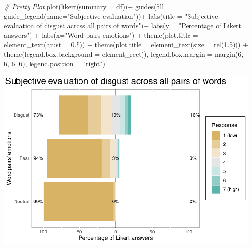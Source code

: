 \documentclass[
]{article}
\newenvironment{Shaded}{\begin{snugshade}}{\end{snugshade}}
\newcommand{\AttributeTok}[1]{\textcolor[rgb]{0.77,0.63,0.00}{#1}}
\newcommand{\CommentTok}[1]{\textcolor[rgb]{0.56,0.35,0.01}{\textit{#1}}}
\newcommand{\DecValTok}[1]{\textcolor[rgb]{0.00,0.00,0.81}{#1}}
\newcommand{\FloatTok}[1]{\textcolor[rgb]{0.00,0.00,0.81}{#1}}
\newcommand{\FunctionTok}[1]{\textcolor[rgb]{0.00,0.00,0.00}{#1}}
\newcommand{\NormalTok}[1]{#1}
\newcommand{\SpecialCharTok}[1]{\textcolor[rgb]{0.00,0.00,0.00}{#1}}
\newcommand{\StringTok}[1]{\textcolor[rgb]{0.31,0.60,0.02}{#1}}
\begin{document}
\begin{Shaded}
\begin{Highlighting}[]
\CommentTok{\# Pretty Plot}
\FunctionTok{plot}\NormalTok{(}\FunctionTok{likert}\NormalTok{(}\AttributeTok{summary =}\NormalTok{ df))}\SpecialCharTok{+} 
  \FunctionTok{guides}\NormalTok{(}\AttributeTok{fill =} \FunctionTok{guide\_legend}\NormalTok{(}\AttributeTok{name=}\StringTok{"Subjective evaluation"}\NormalTok{))}\SpecialCharTok{+} 
  \FunctionTok{labs}\NormalTok{(}\AttributeTok{title =} \StringTok{"Subjective evaluation of disgust across all pairs of words"}\NormalTok{)}\SpecialCharTok{+}
  \FunctionTok{labs}\NormalTok{(}\AttributeTok{y =} \StringTok{"Percentage of Likert answers"}\NormalTok{) }\SpecialCharTok{+}
  \FunctionTok{labs}\NormalTok{(}\AttributeTok{x=}\StringTok{"Word pairs\textquotesingle{} emotions"}\NormalTok{) }\SpecialCharTok{+}
  \FunctionTok{theme}\NormalTok{(}\AttributeTok{plot.title =} \FunctionTok{element\_text}\NormalTok{(}\AttributeTok{hjust =} \FloatTok{0.5}\NormalTok{)) }\SpecialCharTok{+}
  \FunctionTok{theme}\NormalTok{(}\AttributeTok{plot.title =} \FunctionTok{element\_text}\NormalTok{(}\AttributeTok{size =} \FunctionTok{rel}\NormalTok{(}\FloatTok{1.5}\NormalTok{))) }\SpecialCharTok{+}
  \FunctionTok{theme}\NormalTok{(}\AttributeTok{legend.box.background =} \FunctionTok{element\_rect}\NormalTok{(), }\AttributeTok{legend.box.margin =} \FunctionTok{margin}\NormalTok{(}\DecValTok{6}\NormalTok{, }\DecValTok{6}\NormalTok{, }\DecValTok{6}\NormalTok{, }\DecValTok{6}\NormalTok{), }\AttributeTok{legend.position =} \StringTok{"right"}\NormalTok{)}
\end{Highlighting}
\end{Shaded}

\includegraphics{DAP_v4-1-22_files/figure-latex/unnamed-chunk-4-1.pdf}
\end{document}
